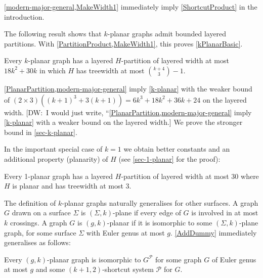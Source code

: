 \documentclass{patmorin}
\newcommand{\note}[2]{{\color{red}[#1:~#2]}}
\newcommand{\PP}{\mathcal{P}}
\renewcommand{\leq}{\leqslant}
\newcommand{\treewidth}{\ensuremath{\binom{k+4}{3}}-1}
\begin{document}
\cref{modern-major-general,MakeWidth1} immediately imply \cref{ShortcutProduct} in the introduction.

The following result shows that $k$-planar graphs admit bounded layered partitions. With \cref{PartitionProduct,MakeWidth1}, this proves \cref{kPlanarBasic}. %

\begin{thm}
\label{k-planar}
Every $k$-planar graph has a layered $H$-partition of layered width at most $18k^2 + 30k$ in which $H$ has treewidth at most $\binom{k+4}{3}-1$. %
\end{thm}

\cref{PlanarPartition,modern-major-general} imply \cref{k-planar} with the weaker bound of $(2\times 3)((k+1)^3+3(k+1))=6k^3 + 18k^2 + 36k+24$ on the layered width. 
\note{DW}{I would just write, ``\cref{PlanarPartition,modern-major-general} imply \cref{k-planar} with a weaker bound on the layered width.}
We prove the stronger bound in \cref{sec-k-planar}. 

In the important special case of $k=1$ we obtain better constants and an additional property (planarity) of $H$ (see \cref{sec-1-planar} for the proof):

\begin{thm}
\label{1-planar}
Every 1-planar graph has a layered $H$-partition of layered width at most 30 where $H$ is planar and has treewidth at most 3.
\end{thm}


The definition of $k$-planar graphs naturally generalises for other surfaces. A graph $G$ drawn on a surface $\Sigma$ is $(\Sigma,k)$-plane if every edge of $G$ is involved in at most $k$ crossings.  A graph $G$ is $(g,k)$-planar if it is isomorphic to some $(\Sigma,k)$-plane graph, for some surface $\Sigma$ with Euler genus at most $g$. 
\cref{AddDummy} immediately generalises as follows:

\begin{obs}
\label{gAddDummy}
Every $(g,k)$-planar graph is isomorphic to $G^\PP$ for some graph $G$ of Euler genus at most $g$ and some $(k+1,2)$-shortcut system $\PP$ for $G$. 
\end{obs}
\end{document}
